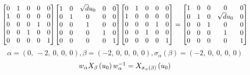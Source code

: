 \documentclass[11pt]{article}
\theoremstyle{definition}
\begin{document}
\[
\scaletoalign{\textwidth}{{\left[\begin{matrix}0 & 1 & 0 & 0 & 0\\1 & 0 & 0 & 0 & 0\\0 & 0 & 0 & 1 & 0\\0 & 0 & 1 & 0 & 0\\0 & 0 & 0 & 0 & 1\end{matrix}\right]} {\left[\begin{matrix}1 & 0 & \sqrt{d} u_{0} & 0 & 0\\0 & 1 & 0 & 0 & 0\\0 & 0 & 1 & 0 & 0\\0 & 0 & 0 & 1 & 0\\0 & 0 & 0 & 0 & 1\end{matrix}\right]} {\left[\begin{matrix}0 & 1 & 0 & 0 & 0\\1 & 0 & 0 & 0 & 0\\0 & 0 & 0 & 1 & 0\\0 & 0 & 1 & 0 & 0\\0 & 0 & 0 & 0 & 1\end{matrix}\right]} = {\left[\begin{matrix}1 & 0 & 0 & 0 & 0\\0 & 1 & 0 & \sqrt{d} u_{0} & 0\\0 & 0 & 1 & 0 & 0\\0 & 0 & 0 & 1 & 0\\0 & 0 & 0 & 0 & 1\end{matrix}\right]}}
\]
\[
\alpha = \left( 0, \  -2, \  0, \  0, \  0\right), \beta = \left( -2, \  0, \  0, \  0, \  0\right), \sigma_{\alpha}(\beta) = \left( -2, \  0, \  0, \  0, \  0\right)
\]
\[
\scaletoalign{\textwidth}{w_{\alpha} X_{\beta}\left(u_{0}\right) w_{\alpha}^{-1} = X_{\sigma_{\alpha}\left(\beta\right)}\left(u_{0}\right)}
\]
\end{document}
